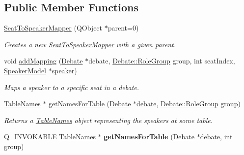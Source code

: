 \subsection*{Public Member Functions}
\begin{DoxyCompactItemize}
\item 
\hypertarget{classSeatToSpeakerMapper_a9978292542a75eef5da708caf487c76b}{\hyperlink{classSeatToSpeakerMapper_a9978292542a75eef5da708caf487c76b}{Seat\-To\-Speaker\-Mapper} (Q\-Object $\ast$parent=0)}\label{classSeatToSpeakerMapper_a9978292542a75eef5da708caf487c76b}

\begin{DoxyCompactList}\small\item\em Creates a new \hyperlink{classSeatToSpeakerMapper}{Seat\-To\-Speaker\-Mapper} with a given parent. \end{DoxyCompactList}\item 
void \hyperlink{classSeatToSpeakerMapper_afecf8db446d9e0adfe5a5d14bf28e232}{add\-Mapping} (\hyperlink{classDebate}{Debate} $\ast$debate, \hyperlink{classDebate_ae9871a36a2f3de7a7da8922d70fbece4}{Debate\-::\-Role\-Group} group, int seat\-Index, \hyperlink{classSpeakerModel}{Speaker\-Model} $\ast$speaker)
\begin{DoxyCompactList}\small\item\em Maps a speaker to a specific seat in a debate. \end{DoxyCompactList}\item 
\hyperlink{classTableNames}{Table\-Names} $\ast$ \hyperlink{classSeatToSpeakerMapper_a4664111c6684c4943173594ff631261a}{get\-Names\-For\-Table} (\hyperlink{classDebate}{Debate} $\ast$debate, \hyperlink{classDebate_ae9871a36a2f3de7a7da8922d70fbece4}{Debate\-::\-Role\-Group} group)
\begin{DoxyCompactList}\small\item\em Returns a {\ttfamily \hyperlink{classTableNames}{Table\-Names}} object representing the speakers at some table. \end{DoxyCompactList}\item 
\hypertarget{classSeatToSpeakerMapper_a900eeb6a8050ad64aa0ae1eea69bcc97}{Q\-\_\-\-I\-N\-V\-O\-K\-A\-B\-L\-E \hyperlink{classTableNames}{Table\-Names} $\ast$ {\bfseries get\-Names\-For\-Table} (\hyperlink{classDebate}{Debate} $\ast$debate, int group)}\label{classSeatToSpeakerMapper_a900eeb6a8050ad64aa0ae1eea69bcc97}

\end{DoxyCompactItemize}



